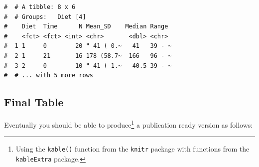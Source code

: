 \documentclass[a4paper,9pt,twocolumn,twoside,printwatermark=false]{pinp}
\begin{document}
\begin{Shaded}
\end{Shaded}

\begin{ShadedResult}
\begin{verbatim}
#  # A tibble: 8 x 6
#  # Groups:   Diet [4]
#    Diet  Time      N Mean_SD    Median Range 
#    <fct> <fct> <int> <chr>       <dbl> <chr> 
#  1 1     0        20 " 41 ( 0.~   41   39 - ~
#  2 1     21       16 178 (58.7~  166   96 - ~
#  3 2     0        10 " 41 ( 1.~   40.5 39 - ~
#  # ... with 5 more rows
\end{verbatim}
\end{ShadedResult}

\subsection{Final Table}\label{final-table}

Eventually you should be able to produce\footnote{Using the
  \texttt{kable()} function from the \texttt{knitr} package with
  functions from the \texttt{kableExtra} package.} a publication ready
version as follows:
\end{document}
